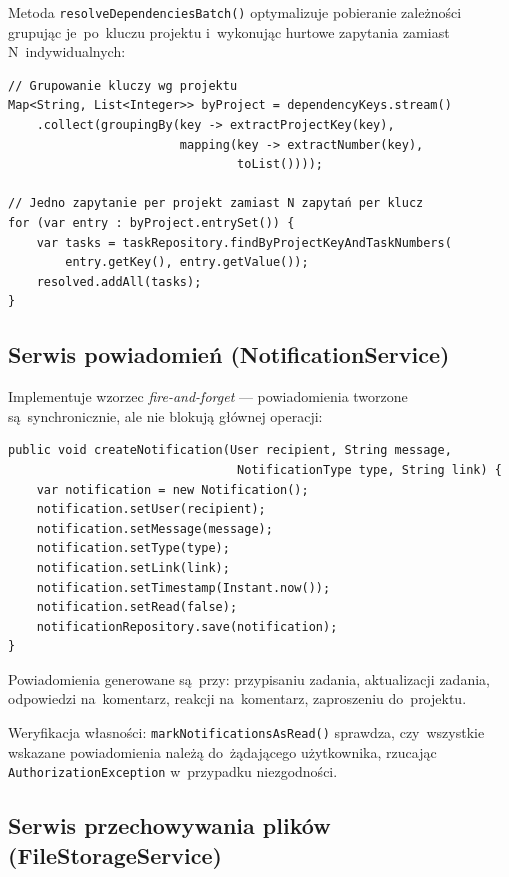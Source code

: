 Metoda \texttt{resolveDependenciesBatch()} optymalizuje pobieranie zależności grupując je~po~kluczu projektu i~wykonując hurtowe zapytania zamiast N~indywidualnych:

\begin{verbatim}
// Grupowanie kluczy wg projektu
Map<String, List<Integer>> byProject = dependencyKeys.stream()
    .collect(groupingBy(key -> extractProjectKey(key),
                        mapping(key -> extractNumber(key),
                                toList())));

// Jedno zapytanie per projekt zamiast N zapytań per klucz
for (var entry : byProject.entrySet()) {
    var tasks = taskRepository.findByProjectKeyAndTaskNumbers(
        entry.getKey(), entry.getValue());
    resolved.addAll(tasks);
}
\end{verbatim}

\subsection{Serwis powiadomień (NotificationService)}

Implementuje wzorzec \textit{fire-and-forget} --- powiadomienia tworzone są~synchronicznie, ale nie blokują głównej operacji:

\begin{verbatim}
public void createNotification(User recipient, String message,
                                NotificationType type, String link) {
    var notification = new Notification();
    notification.setUser(recipient);
    notification.setMessage(message);
    notification.setType(type);
    notification.setLink(link);
    notification.setTimestamp(Instant.now());
    notification.setRead(false);
    notificationRepository.save(notification);
}
\end{verbatim}

Powiadomienia generowane są~przy: przypisaniu zadania, aktualizacji zadania, odpowiedzi na~komentarz, reakcji na~komentarz, zaproszeniu do~projektu.

Weryfikacja własności: \texttt{markNotificationsAsRead()} sprawdza, czy~wszystkie wskazane powiadomienia należą do~żądającego użytkownika, rzucając \texttt{AuthorizationException} w~przypadku niezgodności.

\subsection{Serwis przechowywania plików (FileStorageService)}

